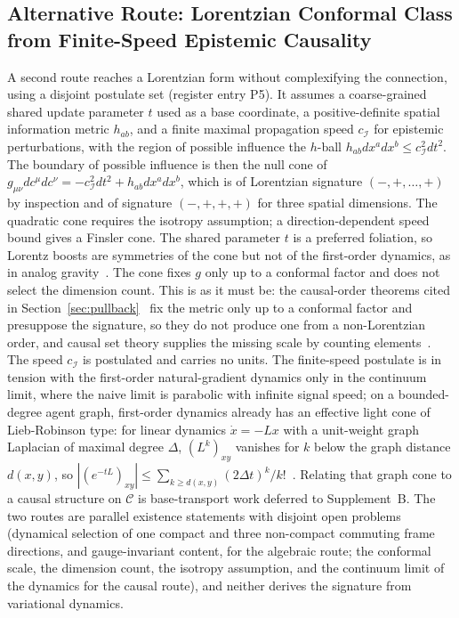 \documentclass[11pt]{article}
\begin{document}
\subsection{Alternative Route: Lorentzian Conformal Class from Finite-Speed Epistemic Causality}
\label{sec:causal_cone_route}

A second route reaches a Lorentzian form without complexifying the connection, using a disjoint postulate set (register entry P5). It assumes a coarse-grained shared update parameter $t$ used as a base coordinate, a positive-definite spatial information metric $h_{ab}$, and a finite maximal propagation speed $c_\mathcal{I}$ for epistemic perturbations, with the region of possible influence the $h$-ball $h_{ab}dx^a dx^b \le c_\mathcal{I}^2 dt^2$. The boundary of possible influence is then the null cone of $g_{\mu\nu} dc^\mu dc^\nu = -c_\mathcal{I}^2 dt^2 + h_{ab} dx^a dx^b$, which is of Lorentzian signature $(-,+,\ldots,+)$ by inspection and of signature $(-,+,+,+)$ for three spatial dimensions. The quadratic cone requires the isotropy assumption; a direction-dependent speed bound gives a Finsler cone. The shared parameter $t$ is a preferred foliation, so Lorentz boosts are symmetries of the cone but not of the first-order dynamics, as in analog gravity~\cite{BarceloLiberatiVisser2011}. The cone fixes $g$ only up to a conformal factor and does not select the dimension count. This is as it must be: the causal-order theorems cited in Section~\ref{sec:pullback}~\cite{HawkingKingMcCarthy1976, Malament1977} fix the metric only up to a conformal factor and presuppose the signature, so they do not produce one from a non-Lorentzian order, and causal set theory supplies the missing scale by counting elements~\cite{BombelliLeeMeyerSorkin1987}. The speed $c_\mathcal{I}$ is postulated and carries no units. The finite-speed postulate is in tension with the first-order natural-gradient dynamics only in the continuum limit, where the naive limit is parabolic with infinite signal speed; on a bounded-degree agent graph, first-order dynamics already has an effective light cone of Lieb-Robinson type: for linear dynamics $\dot{x} = -Lx$ with a unit-weight graph Laplacian of maximal degree $\Delta$, $(L^k)_{xy}$ vanishes for $k$ below the graph distance $d(x,y)$, so $|(e^{-tL})_{xy}| \le \sum_{k \ge d(x,y)}(2\Delta t)^k/k!$~\cite{LiebRobinson1972, Marchioro1978}. Relating that graph cone to a causal structure on $\mathcal{C}$ is base-transport work deferred to Supplement~B. The two routes are parallel existence statements with disjoint open problems (dynamical selection of one compact and three non-compact commuting frame directions, and gauge-invariant content, for the algebraic route; the conformal scale, the dimension count, the isotropy assumption, and the continuum limit of the dynamics for the causal route), and neither derives the signature from variational dynamics.
\end{document}
